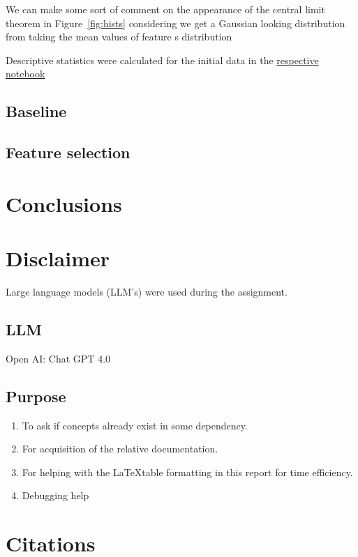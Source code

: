 \documentclass[12pt, a4paper]{article}
\begin{document}
\begin{multicols}{2}

    We can make some sort of comment on the appearance of the central limit theorem in Figure~\ref{fig:hists} considering we get a Gaussian looking distribution \cite{} from taking the mean values of feature s distribution
    \newline

    Descriptive statistics were calculated for the initial data in the \href{}{respective notebook}

    \subsection{Baseline} \label{subsec:baseline}

    \subsection{Feature selection} \label{subsec:fs}

    \section{Conclusions} \label{sec:conc}

    \section{Disclaimer} \label{sec:disc}

    Large language models (LLM's) were used during the assignment.

    \subsection{LLM} \label{subsec:llms}

    Open AI: Chat GPT 4.0 \cite{noauthor_chatgpt_nodate}

    \subsection{Purpose} \label{subsec:llmUse}

    \begin{enumerate} \label{enm:llm}
        \item To ask if concepts already exist in some dependency.
        \item For acquisition of the relative documentation.
        \item For helping with the \LaTeX table formatting in this report for time efficiency.
        \item Debugging help
    \end{enumerate}

    \section{Citations} \label{sec:citations}

    \printbibliography

\end{multicols}
\end{document}
